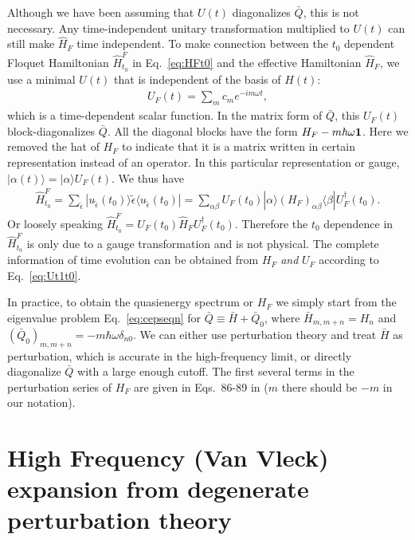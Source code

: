 Although we have been assuming that $U(t)$ diagonalizes $\bar{Q}$, this is not necessary. Any time-independent unitary transformation multiplied to $U(t)$ can still make $\hat{H}_F$ time independent. To make connection between the $t_0$ dependent Floquet Hamiltonian $\hat{H}^F_{t_0}$ in Eq.~\ref{eq:HFt0} and the effective Hamiltonian $\hat{H}_F$, we use a minimal $U(t)$ that is independent of the basis of $\hat{H}(t)$:
\begin{eqnarray}
	U_F(t) =\sum_m c_m e^{-im\omega t},
\end{eqnarray}
which is a time-dependent scalar function. In the matrix form of $\bar{Q}$, this $U_F(t)$ block-diagonalizes $\bar{Q}$. All the diagonal blocks have the form $H_F - m\hbar \omega \bf{1}$. Here we removed the hat of $H_F$ to indicate that it is a matrix written in certain representation instead of an operator. In this particular representation or gauge, $|\alpha(t)\rangle = |\alpha\rangle U_F(t)$. We thus have
\begin{eqnarray}
	\hat{H}_{t_0}^F = \sum_{\tilde{\epsilon}}|u_{\tilde{\epsilon}}(t_0)\rangle \tilde{\epsilon} \langle u_{\tilde{\epsilon}} (t_0)| = \sum_{\alpha\beta} U_F(t_0) |\alpha\rangle (H_F)_{\alpha\beta} \langle \beta | U_F^\dag(t_0).
\end{eqnarray}
Or loosely speaking $\hat{H}_{t_0}^F =  U_F(t_0) \hat{H}_F U_F^\dag(t_0)$. Therefore the $t_0$ dependence in $\hat{H}_{t_0}^F$ is only due to a gauge transformation and is not physical. The complete information of time evolution can be obtained from $H_F$ \emph{and} $U_F$ according to Eq.~\ref{eq:Ut1t0}.

In practice, to obtain the quasienergy spectrum or $H_F$ we simply start from the eigenvalue problem Eq.~\ref{eq:cepseqn} for $\bar{Q}\equiv \bar{H} + \bar{Q}_0$, where $\bar{H}_{m,m+n} = H_n$ and $(\bar{Q}_0)_{m,m+n} = -m\hbar \omega \delta_{n0}$. We can either use perturbation theory and treat $\bar{H}$ as perturbation, which is accurate in the high-frequency limit, or directly diagonalize $\bar{Q}$ with a large enough cutoff. The first several terms in the perturbation series of $H_F$ are given in Eqs.~86-89 in \cite{AEE} ($m$ there should be $-m$ in our notation).

\section{High Frequency (Van Vleck) expansion from degenerate perturbation theory}

